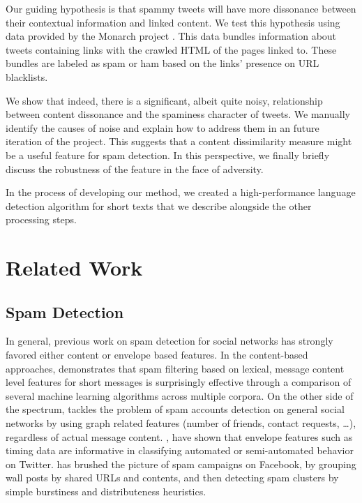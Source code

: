 \documentclass[times, 11pt, twocolumn]{article}
\begin{document}
Our guiding hypothesis is that spammy tweets will have more dissonance between their 
contextual information and linked content. We test this hypothesis using data provided by the 
Monarch project \cite{Thomas2011}. This data bundles information about tweets containing 
links with the crawled HTML of the pages linked to. These bundles are labeled as spam or 
ham based on the links' presence on URL blacklists.

We show that indeed, there is a significant, albeit quite noisy, relationship between content
dissonance and the spaminess character of tweets. We manually identify the causes of noise 
and explain how to address them in an future iteration of the project. This suggests that
a content dissimilarity measure might be a useful feature for spam detection. In this perspective,
we finally briefly discuss the robustness of the feature in the face of adversity.

In the process of developing our method, we created a high-performance language detection 
algorithm for short texts that we describe alongside the other processing steps.

\section{Related Work}
\subsection{Spam Detection}
In general, previous work on spam detection for social networks has strongly favored 
either content or envelope based features. In the content-based approaches, \cite{Cormack2007} 
demonstrates that spam filtering based on lexical, message content level features 
for short messages is surprisingly effective through a comparison of several machine 
learning algorithms across multiple corpora. On the other side of the spectrum, \cite{Stringhini2010} 
tackles the problem of spam accounts detection on general social networks by using graph 
related features (number of friends, contact requests, \dots), regardless of actual 
message content. \cite{Zhang2011}, \cite{Ghosh2011} have shown that envelope features 
such as timing data are informative in classifying automated or semi-automated behavior 
on Twitter. \cite{Gao2010} has brushed the picture of spam campaigns on Facebook, by grouping 
wall posts by shared URLs and contents, and then detecting spam clusters by simple 
burstiness and distributeness heuristics.
\end{document}
